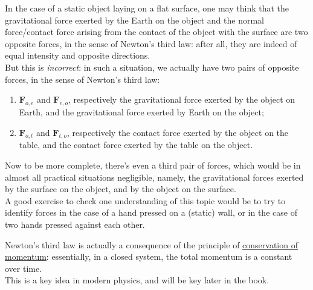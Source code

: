 \documentclass[solutions.tex]{subfiles}
\renewcommand{\bm}[1]{\pmb{#1}}
\begin{document}
\begin{remark} In the case of a static object laying on a flat surface, one
may think that the gravitational force exerted by the Earth on the object and
the normal force/contact force arising from the contact of the object with
the surface are two opposite forces, in the sense of Newton's third law: after
all, they are indeed of equal intensity and opposite directions. \\

But this is \textit{incorrect}: in such a situation, we actually
have two pairs of opposite forces, in the sense of Newton's third law:
\begin{enumerate}
	\item $\bm{F}_{o,e}$ and $\bm{F}_{e,o}$, respectively the gravitational
	force exerted by the object on Earth, and the gravitational force
	exerted by Earth on the object;
	\item $\bm{F}_{o,t}$ and $\bm{F}_{t,o}$, respectively the contact
	force exerted by the object on the table, and the contact force
	exerted by the table on the object.
\end{enumerate}

Now to be more complete, there's even a third pair of forces, which would
be in almost all practical situations negligible, namely, the gravitational
forces exerted by the surface on the object, and by the object on the
surface. \\

A good exercise to check one understanding of this topic would be to try
to identify forces in the case of a hand pressed on a (static) wall, or
in the case of two hands pressed against each other.
\end{remark}

\begin{remark} Newton's third law is actually a consequence of the
principle of \href{https://en.wikipedia.org/wiki/Conservation\_of\_momentum}
{conservation of momentum}: essentially, in a closed system, the total
momentum is a constant over time. \\

This is a key idea in modern physics, and will be key later in the
book.
\end{remark}
\end{document}
